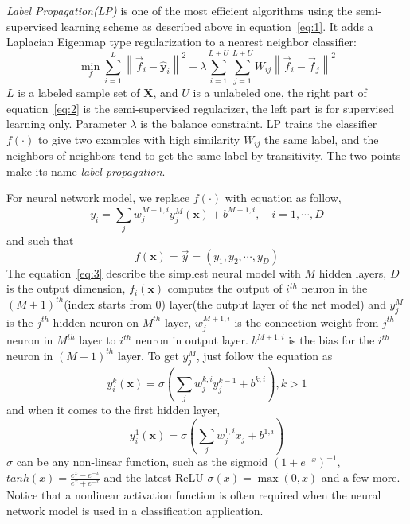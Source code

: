 \documentclass[3p,times,procedia]{elsarticle}
\begin{document}
\emph{Label Propagation(LP)}
\cite{zhu2002learning} 
is one of the most efficient algorithms using 
the semi-supervised learning scheme as 
described above in equation~\ref{eq:1}. 
It adds a Laplacian Eigenmap type 
regularization to a nearest neighbor 
classifier:
\begin{equation}
	\min_f
	\sum^L_{i=1}
	\left\|
	\vec{f}_i-\mathbf{\hat{y}}_i
	\right\|^2 +
	\lambda
	\sum^{L+U}_{i=1}
	\sum^{L+U}_{j=1}
	W_{ij}
	\left\|
	\vec{f}_i-\vec{f}_j
	\right\|^2
	\label{eq:2}
\end{equation}
$L$ is a labeled sample set of $\mathbf{X}$, 
and $U$ is 
a unlabeled one, the right part of 
equation~\ref{eq:2} is the semi-supervised 
regularizer,
the left part is for supervised learning only.
Parameter $\lambda$ is the balance constraint. 
LP trains the classifier $f(\cdot)$ to give
two examples with high similarity $W_{ij}$
the same label, and the neighbors of neighbors
tend to get the same label by transitivity.
The two points make its name \emph{label
propagation}.

For neural network model,
we replace $f(\cdot)$ with equation as follow,
\begin{equation}
	y_i=\sum_j w_j^{M+1,i}y^M_j(\mathbf{x})
	+b^{M+1,i},\quad i=1,\cdots,D
\label{eq:3}
\end{equation}
and such that
\begin{equation}
	f(\mathbf{x}) = \vec{y}=
	\left(y_1,y_2,\cdots,y_D\right)
\label{eq:4}
\end{equation}
The equation~\ref{eq:3} describe the simplest 
neural model with $M$ hidden layers, $D$ is 
the output dimension, $f_i(\mathbf{x})$ 
computes the output of $i^{th}$ neuron in the
$(M+1)^{th}$(index starts from 0) 
layer(the output layer of the net model) 
and $y^{M}_j$ is the $j^{th}$ hidden
neuron on $M^{th}$ layer, $w^{M+1,i}_j$
is the connection weight from $j^{th}$
neuron in $M^{th}$ layer to 
$i^{th}$ neuron in output layer.
$b^{M+1,i}$ is the bias for the $i^{th}$
neuron in $(M+1)^{th}$ layer.
To get $y_j^M$, just follow the equation as
\begin{equation}
	y^k_i(\mathbf{x}) = \sigma\left(
		\sum_j w_j^{k,i}y_j^{k-1}
		+b^{k,i}
	\right),k>1
	\label{eq:5}
\end{equation}
and when it comes to the first hidden layer,
\begin{equation}
	y^1_i(\mathbf{x})=
	\sigma\left(\sum_jw_j^{1,i}x_j
	+b^{1,i}\right)
	\label{eq:6}
\end{equation}
$\sigma$ can be any non-linear function, such as
the sigmoid $\left(1+e^{-x}\right)^{-1}$, 
$tanh(x)=\frac{e^x-e^{-x}}{e^x+e^{-x}}$ and 
the latest ReLU $\sigma(x)=\max(0,x)$ and a few
more. Notice that a nonlinear activation
function is often required when the neural
network model is used in a classification
application.
\end{document}
